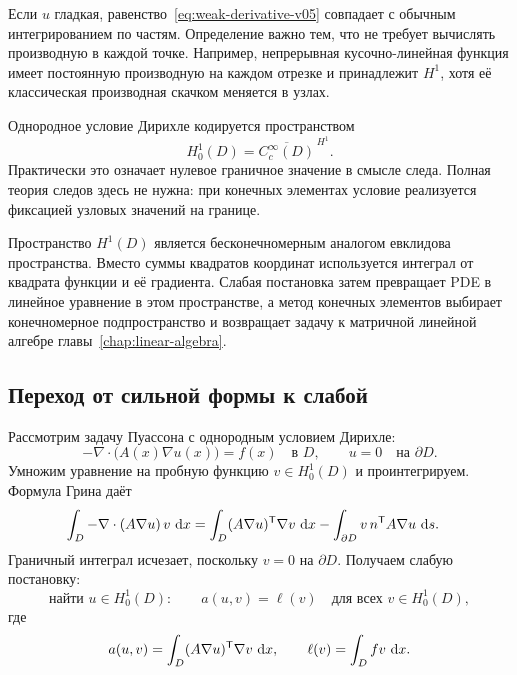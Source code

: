 Если $u$ гладкая, равенство~\eqref{eq:weak-derivative-v05} совпадает с обычным интегрированием по частям. Определение важно тем, что не требует вычислять производную в каждой точке. Например, непрерывная кусочно-линейная функция имеет постоянную производную на каждом отрезке и принадлежит $H^1$, хотя её классическая производная скачком меняется в узлах.

Однородное условие Дирихле кодируется пространством
\begin{equation}
\label{eq:h10-space-v05}
 H_0^1(D)
 =
 \overline{C_c^\infty(D)}^{\,H^1}.
\end{equation}
Практически это означает нулевое граничное значение в смысле следа. Полная теория следов здесь не нужна: при конечных элементах условие реализуется фиксацией узловых значений на границе.

\begin{connection}
Пространство $H^1(D)$ является бесконечномерным аналогом евклидова пространства. Вместо суммы квадратов координат используется интеграл от квадрата функции и её градиента. Слабая постановка затем превращает PDE в линейное уравнение в этом пространстве, а метод конечных элементов выбирает конечномерное подпространство и возвращает задачу к матричной линейной алгебре главы~\ref{chap:linear-algebra}.
\end{connection}

\subsection{Переход от сильной формы к слабой}

Рассмотрим задачу Пуассона с однородным условием Дирихле:
\begin{equation}
\label{eq:poisson-strong-v05}
 -\nabla\cdot\bigl(A(x)\nabla u(x)\bigr)=f(x)
 \quad\text{в }D,
 \qquad
 u=0
 \quad\text{на }\partial D.
\end{equation}
Умножим уравнение на пробную функцию $v\in H_0^1(D)$ и проинтегрируем. Формула Грина даёт
\begin{align}
 \int_D
 -\nabla\cdot(A\nabla u)\,v\,\mathop{}\!\mathrm{d} x
 &=
 \int_D
 (A\nabla u)^{\mathsf{T}}\nabla v\,\mathop{}\!\mathrm{d} x
 -
 \int_{\partial D}
 v\,n^{\mathsf{T}}A\nabla u\,\mathop{}\!\mathrm{d} s.
\end{align}
Граничный интеграл исчезает, поскольку $v=0$ на $\partial D$. Получаем слабую постановку:
\begin{equation}
\label{eq:poisson-weak-v05}
 \text{найти }u\in H_0^1(D):
 \qquad
 a(u,v)=\ell(v)
 \quad
 \text{для всех }v\in H_0^1(D),
\end{equation}
где
\begin{equation}
\label{eq:bilinear-and-load-v05}
 a(u,v)
 =
 \int_D (A\nabla u)^{\mathsf{T}}\nabla v\,\mathop{}\!\mathrm{d} x,
 \qquad
 \ell(v)
 =
 \int_D fv\,\mathop{}\!\mathrm{d} x.
\end{equation}


